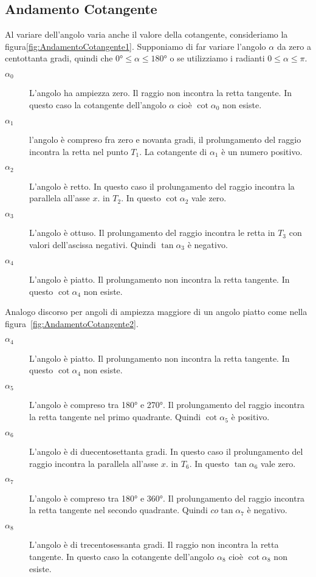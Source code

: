 \subsection{Andamento Cotangente}
\label{sec:AndamentoCotangente}
Al variare dell'angolo varia anche il valore della cotangente, consideriamo la figura\nobs\vref{fig:AndamentoCotangente1}. Supponiamo di far variare l'angolo $\alpha$ da zero a centottanta gradi, quindi che $\ang{0}\leq\alpha\leq\ang{180}$ o se utilizziamo i radianti $0\leq\alpha\leq\pi$.
\begin{figure}
	\centering
	
	\label{fig:AndamentoCotangente1}
\end{figure}%
\begin{description}
	\item[$\alpha_0$] L'angolo ha ampiezza zero. Il raggio non incontra la retta tangente. In questo caso  la cotangente  dell'angolo $\alpha$ cioè $\cot\alpha_0$  non esiste.
	\item [$\alpha_1$] l'angolo è compreso fra zero e novanta gradi, il prolungamento del raggio  incontra la retta nel punto $T_1$. La cotangente di $\alpha_1$ è un numero positivo.
	\item [$\alpha_2$] L'angolo  è retto. In questo caso il prolungamento del raggio incontra la parallela all'asse $x$. in $T_2$. In questo    $\cot\alpha_2$ vale zero. 
	\item [$\alpha_3$]  L'angolo è ottuso. Il prolungamento del raggio incontra le retta in $T_3$  con valori dell'ascissa negativi. Quindi $\tan\alpha_3$ è negativo.
	\item [$\alpha_4$] L'angolo  è  piatto. Il  prolungamento non incontra la retta tangente. In questo  $\cot\alpha_4$ non esiste.
\end{description}
Analogo discorso per angoli di ampiezza  maggiore di un angolo  piatto come nella figura~\vref{fig:AndamentoCotangente2}.
\begin{description}
	\item [$\alpha_4$] L'angolo  è  piatto. Il  prolungamento non incontra la retta tangente. In questo  $\cot\alpha_4$ non esiste.
	\item [$\alpha_5$] L'angolo è compreso tra \ang{180} e \ang{270}. Il prolungamento del raggio incontra la retta tangente  nel primo quadrante. Quindi $\cot\alpha_5$ è positivo.
	\item [$\alpha_6$] L'angolo è di duecentosettanta gradi.  In questo caso il prolungamento del raggio incontra la parallela all'asse $x$. in $T_6$. In questo    $\tan\alpha_6$ vale zero. 
	\item [$\alpha_7$] L'angolo è compreso tra \ang{180} e \ang{360}. Il prolungamento del raggio incontra la retta tangente nel secondo quadrante. Quindi $co\tan\alpha_7$ è negativo.
	\item [$\alpha_8$] L'angolo è di trecentosessanta gradi. Il raggio non incontra la retta tangente. In questo caso  la cotangente  dell'angolo $\alpha_8$ cioè $\cot\alpha_8$  non esiste.
\end{description}
